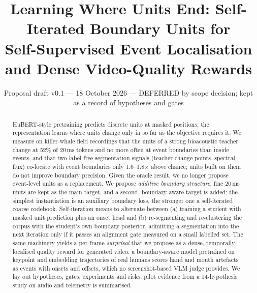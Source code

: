 \documentclass[10pt,twocolumn]{article}
\title{Learning Where Units End: Self-Iterated Boundary Units for\\Self-Supervised Event Localisation and Dense Video-Quality Rewards}
\author{\todo{authors}}
\date{Proposal draft v0.1 --- 18 October 2026 --- DEFERRED by scope decision; kept as a record of hypotheses and gates}
\begin{document}
\maketitle

\begin{abstract}
HuBERT-style pretraining predicts discrete units at masked positions; the representation learns where units change only in so far as the objective requires it. We measure on killer-whale field recordings that the units of a strong bioacoustic teacher change at 52\% of 20\,ms tokens and no more often at event boundaries than inside events, and that two label-free segmentation signals (teacher change-points, spectral flux) co-locate with event boundaries only 1.6--1.8$\times$ above chance; units built on them do not improve boundary precision. Given the oracle result, we no longer propose event-level units as a replacement. We propose \emph{additive boundary structure}: fine 20\,ms units are kept as the main target, and a second, boundary-aware target is added; the simplest instantiation is an auxiliary boundary loss, the stronger one a self-iterated coarse codebook. Self-iteration means to alternate between (a) training a student with masked unit prediction plus an onset head and (b) re-segmenting and re-clustering the corpus with the student's own boundary posterior, admitting a segmentation into the next iteration only if it passes an alignment gate measured on a small labelled set. The same machinery yields a per-frame \emph{surprisal} that we propose as a dense, temporally localised quality reward for generated video: a boundary-aware model pretrained on keypoint and embedding trajectories of real humans scores hand and mouth artefacts as events with onsets and offsets, which no screenshot-based VLM judge provides. We lay out hypotheses, gates, experiments and risks; pilot evidence from a 14-hypothesis study on audio and telemetry is summarised.
\end{abstract}
\end{document}
